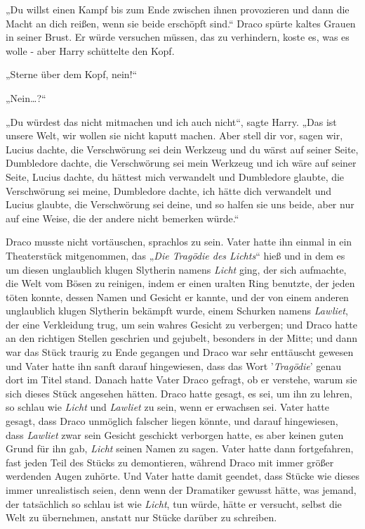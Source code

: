 {„Du willst einen Kampf bis zum Ende zwischen ihnen provozieren und dann die Macht an dich reißen, wenn sie beide erschöpft sind.“ Draco spürte kaltes Grauen in seiner Brust. Er würde versuchen müssen, das zu verhindern, koste es, was es wolle - aber Harry schüttelte den Kopf.

„Sterne über dem Kopf, nein!“

„Nein…?“

„Du würdest das nicht mitmachen und ich auch nicht“, sagte Harry. „Das ist unsere Welt, wir wollen sie nicht kaputt machen. Aber stell dir vor, sagen wir, Lucius dachte, die Verschwörung sei dein Werkzeug und du wärst auf seiner Seite, Dumbledore dachte, die Verschwörung sei mein Werkzeug und ich wäre auf seiner Seite, Lucius dachte, du hättest mich verwandelt und Dumbledore glaubte, die Verschwörung sei meine, Dumbledore dachte, ich hätte dich verwandelt und Lucius glaubte, die Verschwörung sei deine, und so halfen sie uns beide, aber nur auf eine Weise, die der andere nicht bemerken würde.“

Draco musste nicht vortäuschen, sprachlos zu sein. Vater hatte ihn einmal in ein Theaterstück mitgenommen, das „\emph{Die Tragödie des Lichts}“ hieß und in dem es um diesen unglaublich klugen Slytherin namens \emph{Licht} ging, der sich aufmachte, die Welt vom Bösen zu reinigen, indem er einen uralten Ring benutzte, der jeden töten konnte, dessen Namen und Gesicht er kannte, und der von einem anderen unglaublich klugen Slytherin bekämpft wurde, einem Schurken namens \emph{Lawliet}, der eine Verkleidung trug, um sein wahres Gesicht zu verbergen; und Draco hatte an den richtigen Stellen geschrien und gejubelt, besonders in der Mitte; und dann war das Stück traurig zu Ende gegangen und Draco war sehr enttäuscht gewesen und Vater hatte ihn sanft darauf hingewiesen, dass das Wort '\emph{Tragödie}' genau dort im Titel stand. Danach hatte Vater Draco gefragt, ob er verstehe, warum sie sich dieses Stück angesehen hätten. Draco hatte gesagt, es sei, um ihn zu lehren, so schlau wie \emph{Licht} und \emph{Lawliet} zu sein, wenn er erwachsen sei. Vater hatte gesagt, dass Draco unmöglich falscher liegen könnte, und darauf hingewiesen, dass \emph{Lawliet} zwar sein Gesicht geschickt verborgen hatte, es aber keinen guten Grund für ihn gab, \emph{Licht} seinen Namen zu sagen. Vater hatte dann fortgefahren, fast jeden Teil des Stücks zu demontieren, während Draco mit immer größer werdenden Augen zuhörte. Und Vater hatte damit geendet, dass Stücke wie dieses immer unrealistisch seien, denn wenn der Dramatiker gewusst hätte, was jemand, der tatsächlich so schlau ist wie \emph{Licht}, tun würde, hätte er versucht, selbst die Welt zu übernehmen, anstatt nur Stücke darüber zu schreiben.

}
